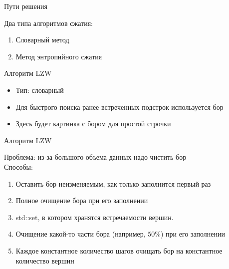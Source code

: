 \documentclass[12pt]{beamer}
\begin{document}
\begin{frame}{Пути решения}

    Два типа алгоритмов сжатия:
    
    \begin{enumerate}

        \item <1-> Словарный метод
        
        \item <2-> Метод энтропийного сжатия

    \end{enumerate}

\end{frame}

\begin{frame}{Алгоритм LZW}

    \begin{itemize}
    
        \item <1-> Тип: словарный

        \item <2-> Для быстрого поиска ранее встреченных подстрок используется бор

        \item <3-> Здесь будет картинка с бором для простой строчки

    \end{itemize}

\end{frame}

\begin{frame}{Алгоритм LZW}

    Проблема: из-за большого объема данных надо чистить бор \\

    Способы:

    \begin{enumerate}

        \item <1-> Оставить бор неизменяемым, как только заполнится первый раз

        \item <2-> Полное очищение бора при его заполнении

        \item <3-> std::set, в котором хранятся встречаемости вершин.
        
        \item <4-> Очищение какой-то части бора (например, $50\%$) при его
        заполнении

        \item <5-> Каждое константное количество шагов очищать бор на 
        константное количество вершин

    \end{enumerate}
    
\end{frame}
\end{document}
